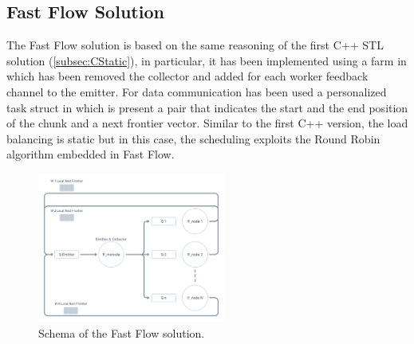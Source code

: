 \subsection{Fast Flow Solution}
The Fast Flow solution is based on the same reasoning of the first C++ STL solution (\ref{subsec:CStatic}), in particular, it has been implemented using a farm in which has been removed the collector and added for each worker feedback channel to the emitter. For data communication has been used a personalized task struct in which is present a pair that indicates the start and the end position of the chunk and a next frontier vector. Similar to the first C++ version,  the load balancing is static but in this case, the scheduling exploits the Round Robin algorithm embedded in Fast Flow.

\begin{figure}[htb!]
    \centering
    \includegraphics[width=0.55\textwidth]{Figures/FF.png}
    \caption{Schema of the Fast Flow solution.}
    \label{fig:FF}
\end{figure}
\FloatBarrier
